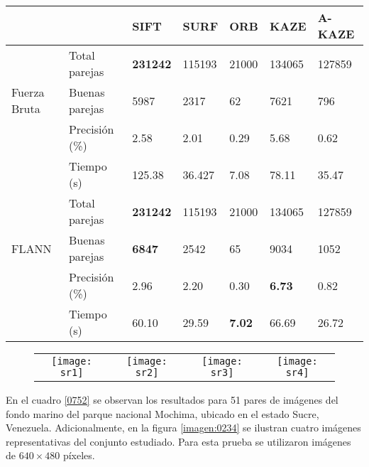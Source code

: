 \begin{table}[h]
	\centering
	\label{SR-2}
	\renewcommand{\arraystretch}{0.8}%
	\begin{tabular}{@{}lllllll@{}}
		\toprule
		&              	 			& SIFT 			 & SURF & ORB & KAZE  & A-KAZE \\ \midrule 
		\hfill\vline& Total parejas  &\textbf{231242}&115193&21000&134065 & 127859  \\
		Fuerza Bruta \vline& Buenas parejas & 5987 	& 2317 & 62  & 7621 & 796    \\
		\hfill\vline& Precisión (\%) & 2.58			&2.01  &0.29 &5.68& 0.62  \\
		\vspace{0.3cm}
		\hfill\vline& Tiempo (s)     & 125.38& 36.427& 7.08 &78.11 & 35.47 \\
		
		\hfill\vline& Total parejas  		&\textbf{231242}		&115193 &21000	&134065 		& 127859  \\
		FLANN  \hfill\vline& Buenas parejas &\textbf{6847}  		& 2542  & 65  	& 9034 			&1052     \\ 
		\hfill\vline& Precisión (\%) 		& 2.96					&2.20   &0.30	& \textbf{6.73} & 0.82  \\
		\hfill\vline& Tiempo (s)     		& 60.10					&29.59 & \textbf{7.02}	& 66.69			& 26.72  \\ 
		\bottomrule
	\end{tabular}
\end{table}
	 
\begin{figure}[h]
 	\centering
 	\vspace{0.6cm}
 	\begin{tabular}{@{}cccc@{}}
 		\texttt{[image: sr1]} &
 		\texttt{[image: sr2]} &
 		\texttt{[image: sr3]} &
 		\texttt{[image: sr4]} 
 	\end{tabular}
 	
 	\label{imagen:SR}
 	
\end{figure}

En el cuadro \ref{0752} se observan los resultados para 51 pares de imágenes del fondo marino del parque nacional Mochima, ubicado en el estado Sucre, Venezuela. Adicionalmente, en la figura \ref{imagen:0234} se ilustran cuatro imágenes representativas del conjunto estudiado. Para esta prueba se utilizaron imágenes de $640\times480$ píxeles.

